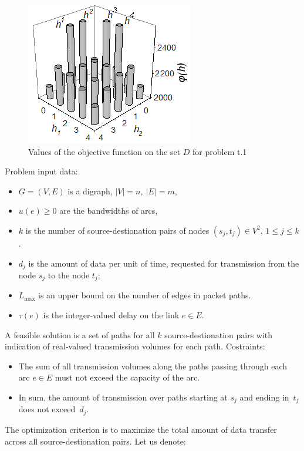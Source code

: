 \documentclass{ifacconf}
\begin{document}
 \begin{figure}[h!]
	\centering
	\includegraphics[scale=0.9]{test}
  \caption{Values of the objective function on the set $D$ for problem t.1\label{t_1}}
  \end{figure}

Problem input data:

\begin{itemize}
 \item $G = (V,E)$ is a digraph, $|V|=n, \ |E|=m$,
 \item $u(e)\ge 0$ are the bandwidths of arcs,
 \item $k$ is the number of  source-destionation pairs of nodes $(s_j, t_j)\in V^2$, $1\le j \le k$.
 \item $d_j$ is the amount of data per unit of time, requested for transmission from the node $s_j$ to the node $t_j$;
\item $L_{\max}$ is an upper bound on the number of edges in packet paths.
 \item $\tau(e)$ is the integer-valued delay on the link $e\in E$.
 \end{itemize}

A feasible solution is a set of paths for all $k$ source-destionation pairs with indication of real-valued
transmission volumes for each path. Costraints:
\begin{itemize}
\item The sum of all transmission volumes along the paths passing through each
arc $e\in E$ must not exceed the capacity of the arc.

\item In sum, the amount of transmission over paths starting at $s_j$ and
ending in~$t_j$ does not exceed~$d_j$.
\end{itemize}

The optimization criterion is to maximize the total amount of data transfer across all 
source-destionation pairs. 
Let us denote:
\end{document}
